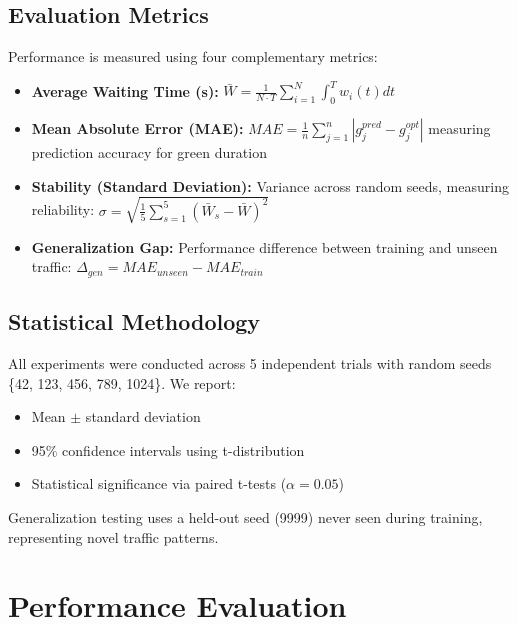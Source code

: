 \documentclass[conference]{IEEEtran}
\begin{document}
\subsection{Evaluation Metrics}
Performance is measured using four complementary metrics:

\begin{itemize}
    \item \textbf{Average Waiting Time (s):} $\bar{W} = \frac{1}{N \cdot T} \sum_{i=1}^{N} \int_0^T w_i(t) dt$

    \item \textbf{Mean Absolute Error (MAE):} $MAE = \frac{1}{n} \sum_{j=1}^{n} |g_j^{pred} - g_j^{opt}|$ measuring prediction accuracy for green duration

    \item \textbf{Stability (Standard Deviation):} Variance across random seeds, measuring reliability: $\sigma = \sqrt{\frac{1}{5}\sum_{s=1}^{5}(\bar{W}_s - \bar{W})^2}$

    \item \textbf{Generalization Gap:} Performance difference between training and unseen traffic: $\Delta_{gen} = MAE_{unseen} - MAE_{train}$
\end{itemize}

\subsection{Statistical Methodology}
All experiments were conducted across 5 independent trials with random seeds \{42, 123, 456, 789, 1024\}. We report:
\begin{itemize}
    \item Mean $\pm$ standard deviation
    \item 95\% confidence intervals using t-distribution
    \item Statistical significance via paired t-tests ($\alpha = 0.05$)
\end{itemize}

Generalization testing uses a held-out seed (9999) never seen during training, representing novel traffic patterns.

\section{Performance Evaluation}
\end{document}
